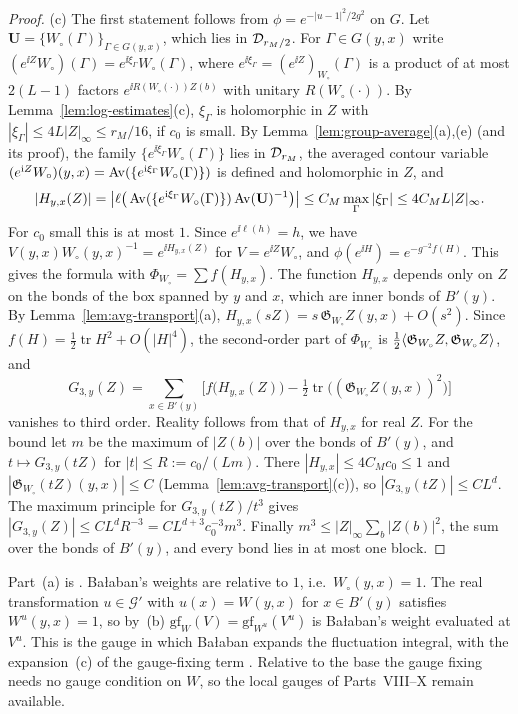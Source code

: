 \begin{proof}
(c) The first statement follows from $\phi=e^{-|u-1|^2/2g^2}$ on $G$. Let $\mathbf U=\{W_\circ(\Gamma)\}_{\Gamma\in G(y,x)}$, which lies in $\mathcal D_{r_M/2}$. For $\Gamma\in G(y,x)$ write $(e^{\ii Z}W_\circ)(\Gamma)=e^{\ii\xi_\Gamma}W_\circ(\Gamma)$, where $e^{\ii\xi_\Gamma}=(e^{\ii Z})_{W_\circ}(\Gamma)$ is a product of at most $2(L-1)$ factors $e^{\ii R(W_\circ(\cdot))Z(b)}$ with unitary $R(W_\circ(\cdot))$. By Lemma~\ref{lem:log-estimates}(c), $\xi_\Gamma$ is holomorphic in $Z$ with $|\xi_\Gamma|\le4L|Z|_\infty\le r_M/16$, if $c_0$ is small. By Lemma~\ref{lem:group-average}(a),(e) (and its proof), the family $\{e^{\ii\xi_\Gamma}W_\circ(\Gamma)\}$ lies in $\mathcal D_{r_M}$, the averaged contour variable $(e^{\mathrm i Z}W_\circ)(y,x)=\operatorname{Av}(\{e^{\mathrm i\xi_\Gamma}W_\circ(\Gamma)\})$ is defined and holomorphic in $Z$, and
\[
|H_{y,x}(Z)|=\big|\ell\big(\operatorname{Av}(\{e^{\mathrm i\xi_\Gamma}W_\circ(\Gamma)\})\operatorname{Av}(\mathbf U)^{-1}\big)\big|\le C_M\max_\Gamma|\xi_\Gamma|\le4C_ML|Z|_\infty .
\]
For $c_0$ small this is at most $1$. Since $e^{\ii\ell(h)}=h$, we have $V(y,x)W_\circ(y,x)^{-1}=e^{\ii H_{y,x}(Z)}$ for $V=e^{\ii Z}W_\circ$, and $\phi(e^{\ii H})=e^{-g^{-2}f(H)}$. This gives the formula with $\Phi_{W_\circ}=\sum f(H_{y,x})$. The function $H_{y,x}$ depends only on $Z$ on the bonds of the box spanned by $y$ and $x$, which are inner bonds of $B'(y)$. By Lemma~\ref{lem:avg-transport}(a), $H_{y,x}(sZ)=s\,\mathfrak G_{W_\circ}Z(y,x)+O(s^2)$. Since $f(H)=\frac12\operatorname{tr}H^2+O(|H|^4)$, the second-order part of $\Phi_{W_\circ}$ is $\frac12\langle \mathfrak G_{W_\circ}Z,\mathfrak G_{W_\circ}Z\rangle$, and
\[
G_{3,y}(Z)=\sum_{x\in B'(y)}\Big[f\big(H_{y,x}(Z)\big)-\tfrac12\operatorname{tr}\big((\mathfrak G_{W_\circ}Z(y,x))^2\big)\Big]
\]
vanishes to third order. Reality follows from that of $H_{y,x}$ for real $Z$. For the bound let $m$ be the maximum of $|Z(b)|$ over the bonds of $B'(y)$, and $t\mapsto G_{3,y}(tZ)$ for $|t|\le R:=c_0/(Lm)$. There $|H_{y,x}|\le4C_Mc_0\le1$ and $|\mathfrak G_{W_\circ}(tZ)(y,x)|\le C$ (Lemma~\ref{lem:avg-transport}(c)), so $|G_{3,y}(tZ)|\le CL^d$. The maximum principle for $G_{3,y}(tZ)/t^3$ gives $|G_{3,y}(Z)|\le CL^dR^{-3}=CL^{d+3}c_0^{-3}m^3$. Finally $m^3\le|Z|_\infty\sum_{b}|Z(b)|^2$, the sum over the bonds of $B'(y)$, and every bond lies in at most one block.
\end{proof}

Part~(a) is \cite[(0.15)--(0.16)]{BalYM4I}. Ba\l aban's weights are relative to $1$, i.e.\ $W_\circ(y,x)=1$. The real transformation $u\in\mathcal G'$ with $u(x)=W(y,x)$ for $x\in B'(y)$ satisfies $W^u(y,x)=1$, so by~(b) $\mathrm{gf}_W(V)=\mathrm{gf}_{W^u}(V^u)$ is Ba\l aban's weight evaluated at $V^u$. This is the gauge in which Ba\l aban expands the fluctuation integral, with the expansion~(c) of the gauge-fixing term \cite[(2.3)--(2.5)]{BalYM4I}. Relative to the base the gauge fixing needs no gauge condition on $W$, so the local gauges of Parts~VIII--X remain available.

